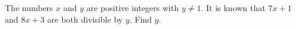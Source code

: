 The numbers $x$ and $y$ are positive integers with $y\ne1$. It is known that $7x+1$ and $8x+3$ are both divisible by $y$. Find $y$.
